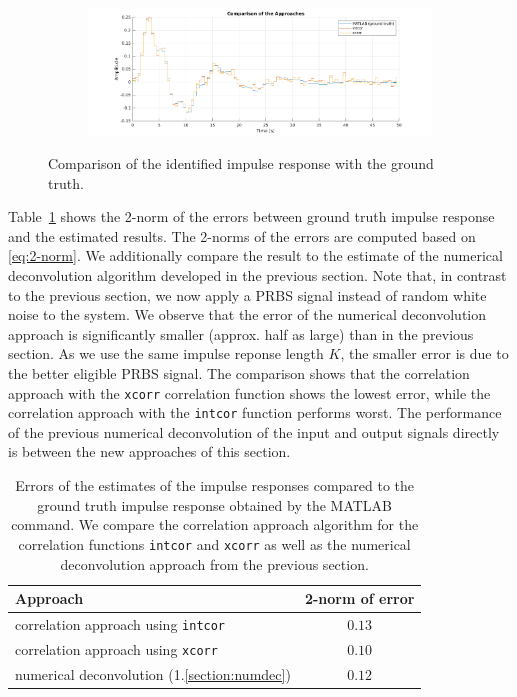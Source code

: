 \documentclass{scrartcl}
\begin{document}
\begin{figure}[h!]
\begin{subfigure}{\textwidth}
		\includegraphics[width=\textwidth]{figures/impulse_response_comparison.pdf}
		\label{fig:impulse_response_comparison}
	\end{subfigure}
	\caption{Comparison of the identified impulse response with the ground truth.}\label{fig:correlation_impulse_responses}
\end{figure}

Table~\ref{tab:correlation_appraoch_errors} shows the 2-norm of the errors between ground truth impulse response and the estimated results.
The 2-norms of the errors are computed based on \eqref{eq:2-norm}.
We additionally compare the result to the estimate of the numerical deconvolution algorithm developed in the previous section.
Note that, in contrast to the previous section, we now apply a PRBS signal instead of random white noise to the system.
We observe that the error of the numerical deconvolution approach is significantly smaller (approx. half as large) than in the previous section. 
As we use the same impulse reponse length $K$, the smaller error is due to the better eligible PRBS signal.
The comparison shows that the correlation approach with the \texttt{xcorr} correlation function shows the lowest error, while the correlation approach with the \texttt{intcor} function performs worst.
The performance of the previous numerical deconvolution of the input and output signals directly is between the new approaches of this section.
\begin{table}[h]
	\centering
	\begin{tabular}{l|c}
	\hline
	\hline
	\textbf{Approach} & \textbf{2-norm of error}\\
	\hline
		correlation approach using \texttt{intcor} & $0.13$ \\
		correlation approach using \texttt{xcorr} & $0.10$ \\\hline
		numerical deconvolution (1.\ref{section:numdec}) & $0.12$\\
	\hline
	\hline
	\end{tabular}
	\caption{Errors of the estimates of the impulse responses compared to the ground truth impulse response obtained by the MATLAB command. We compare the correlation approach algorithm for the correlation functions \texttt{intcor} and \texttt{xcorr} as well as the numerical deconvolution approach from the previous section.}
	\label{tab:correlation_appraoch_errors}
\end{table}
\end{document}
